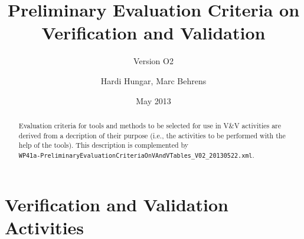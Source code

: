 \documentclass{template/openetcs_article}
\begin{document}
\frontmatter
{}




\title{Preliminary Evaluation Criteria on Verification and Validation}


\subtitle{Version O2}

\date{May 2013}


\author{Hardi Hungar, Marc Behrens}

  
  



\begin{abstract}
  Evaluation criteria for tools and methods to be selected for use in
  V\&V activities are derived from a decription of their purpose
  (i.e., the activities to be performed with the help of the
  tools). This description is complemented by\\
    \texttt{WP41a-PreliminaryEvaluationCriteriaOnVAndVTables\_V02\_20130522.xml}. 
  
  \end{abstract}

\maketitle
\tableofcontents
\listoffiguresandtables
\newpage














\section{Verification and Validation Activities}
\end{document}
